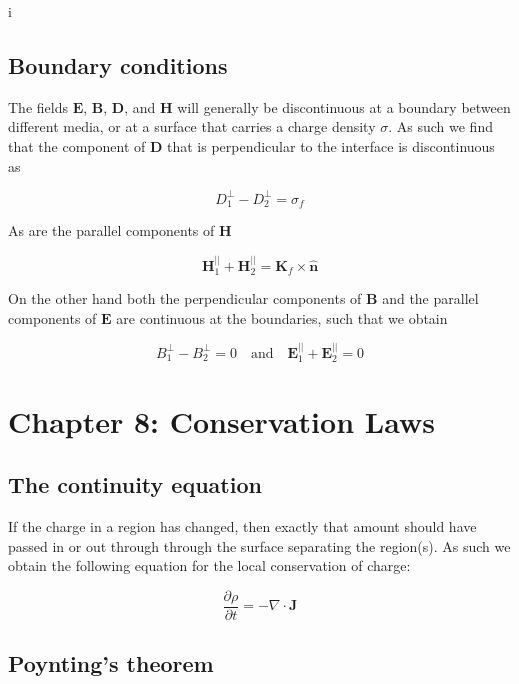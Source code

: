 i\documentclass[a4paper]{article}
\begin{document}
\subsection{Boundary conditions }

The fields $\bm{E}$, $\bm{B}$, $\bm{D}$, and $\bm{H}$ will generally be discontinuous at a boundary between different media, or at a surface that carries a charge density $\sigma$. As such we find that the component of $\bm{D}$ that is perpendicular to the interface is discontinuous as

\begin{equation}
    D_1^{\perp}-D_2^{\perp}=\sigma_f
\end{equation}

As are the parallel components of $\bm{H}$

\begin{equation}
    \bm{H}_1^{||}+\bm{H}_2^{||}=\bm{K}_f\times\bm{\hat{n}}
\end{equation}

On the other hand both the perpendicular components of $\bm{B}$ and the parallel components of $\bm{E}$ are continuous at the boundaries, such that we obtain

\begin{equation}
    B_1^{\perp}-B_2^{\perp}=0\quad\text{and}\quad \bm{E}_1^{||}+\bm{E}_2^{||}=0
\end{equation}

\section{Chapter 8: Conservation Laws}

\subsection{The continuity equation}

If the charge in a region has changed, then exactly that amount should have passed in or out through through the surface separating the region(s). As such we obtain the following equation for the local conservation of charge: 

\begin{equation}
    \frac{\partial \rho}{\partial t}=-\nabla\cdot\bm{J}
\end{equation}

\subsection{Poynting's theorem}
\end{document}
